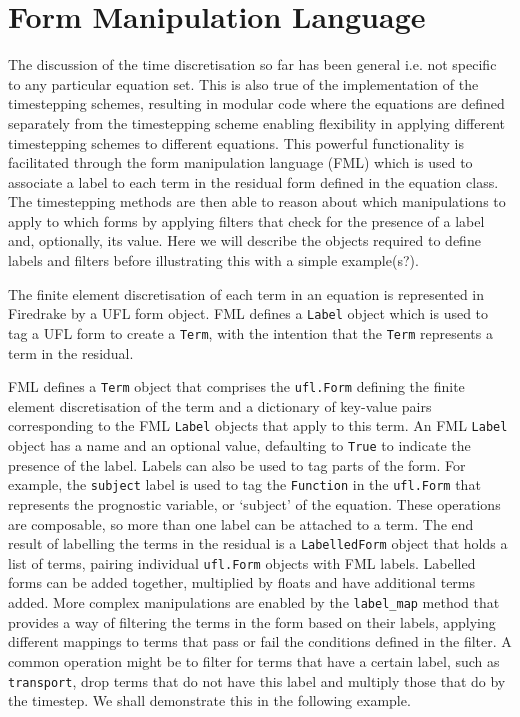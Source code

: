 \documentclass[journal abbreviation, manuscript]{copernicus}
\begin{document}
\section{Form Manipulation Language}
\label{sec: FML}
The discussion of the time discretisation so far has been general i.e.
not specific to any particular equation set. This is also true of the
implementation of the timestepping schemes, resulting in modular code
where the equations are defined separately from the timestepping
scheme enabling flexibility in applying different timestepping schemes
to different equations. This powerful functionality is facilitated
through the form manipulation language (FML) which is used to
associate a label to each term in the residual form defined in the
equation class. The timestepping methods are then able to reason about
which manipulations to apply to which forms by applying filters that
check for the presence of a label and, optionally, its value. Here we
will describe the objects required to define labels and filters before
illustrating this with a simple example(s?).

The finite element discretisation of each term in an equation is
represented in Firedrake by a UFL form object. FML defines a
\texttt{Label} object which is used to tag a UFL form to create a
\texttt{Term}, with the intention that the \texttt{Term} represents a
term in the residual.

FML defines a \texttt{Term} object that comprises the
\texttt{ufl.Form} defining the finite element discretisation of the
term and a dictionary of key-value pairs corresponding to the FML
\texttt{Label} objects that apply to this term. An FML \texttt{Label}
object has a name and an optional value, defaulting to \texttt{True}
to indicate the presence of the label. Labels can also be used to tag
parts of the form. For example, the \texttt{subject} label is used to
tag the \texttt{Function} in the \texttt{ufl.Form} that represents the
prognostic variable, or `subject' of the equation. These operations
are composable, so more than one label can be attached to a term. The
end result of labelling the terms in the residual is a
\texttt{LabelledForm} object that holds a list of terms, pairing
individual \texttt{ufl.Form} objects with FML labels. Labelled forms
can be added together, multiplied by floats and have additional terms
added. More complex manipulations are enabled by the
\texttt{label\_map} method that provides a way of filtering the terms
in the form based on their labels, applying different mappings to
terms that pass or fail the conditions defined in the filter. A common
operation might be to filter for terms that have a certain label, such
as \texttt{transport}, drop terms that do not have this label and
multiply those that do by the timestep. We shall demonstrate this in
the following example.
\end{document}
